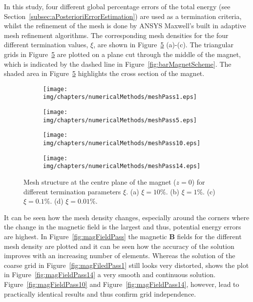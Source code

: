 In this study, four different global percentage errors of the total energy (see Section~\ref{subsec:aPosterioriErrorEstimation}) are used as a termination criteria, whilst the refinement of the mesh is done by ANSYS Maxwell's built in adaptive mesh refinement algorithms. The corresponding mesh densities for the four different termination values, $\xi$, are shown in Figure~\ref{fig:meshPass} (a)-(c). The triangular grids in Figure~\ref{fig:meshPass} are plotted on a plane cut through the middle of the magnet, which is indicated by the dashed line in Figure~\ref{fig:barMagnetScheme}. The shaded area in Figure~\ref{fig:meshPass} highlights the cross section of the magnet. 

\begin{figure}[htb]
        \centering
        \begin{subfigure}[b]{0.47\textwidth}
                \texttt{[image: img/chapters/numericalMethods/meshPass1.eps]}
                \caption{}
                \label{fig:meshPass1}
        \end{subfigure}
        \begin{subfigure}[b]{0.47\textwidth}
                \texttt{[image: img/chapters/numericalMethods/meshPass5.eps]}
                \caption{}
                \label{fig:meshPass5}
        \end{subfigure}
        \begin{subfigure}[b]{0.47\textwidth}
                \texttt{[image: img/chapters/numericalMethods/meshPass10.eps]}
                \caption{}
                \label{fig:meshPass10}
        \end{subfigure}
        \begin{subfigure}[b]{0.47\textwidth}
                \texttt{[image: img/chapters/numericalMethods/meshPass14.eps]}
                \caption{}
                \label{fig:meshPass14}
        \end{subfigure}
        \caption[FEM unstructured mesh at the magnet's centre plane]{Mesh structure at the centre plane of the magnet ($z=0$) for different termination parameters $\xi$. (a) $\xi=10\%$. (b) $\xi=1\%$. (c) $\xi=0.1\%$. (d) $\xi=0.01\%$.}
        \label{fig:meshPass}
\end{figure}

It can be seen how the mesh density changes, especially around the corners where the change in the magnetic field is the largest and thus, potential energy errors are highest. In Figure~\ref{fig:magFieldPass} the magnetic $\mathbf{B}$ fields for the different mesh density are plotted and it can be seen how the accuracy of the solution improves with an increasing number of elements. Whereas the solution of the coarse grid in Figure~\ref{fig:magFiledPass1} still looks very distorted, shows the plot in Figure~\ref{fig:magFieldPass14} a very smooth and continuous solution. Figure~\ref{fig:magFieldPass10} and Figure~\ref{fig:magFieldPass14}, however, lead to practically identical results and thus confirm grid independence. 

